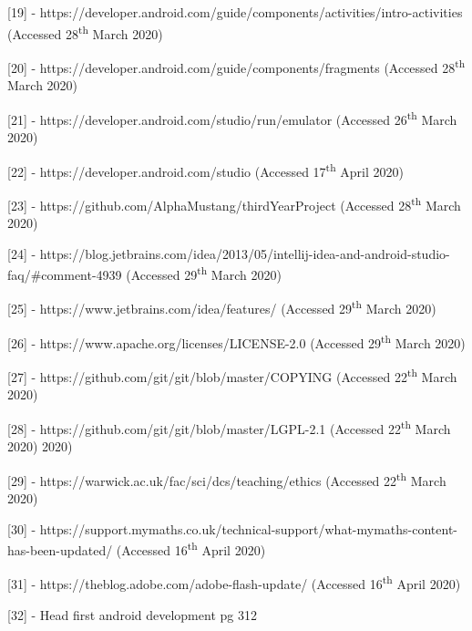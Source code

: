 \documentclass{article}
\begin{document}
[19] - https://developer.android.com/guide/components/activities/intro-activities (Accessed 28\textsuperscript{th} March 2020) \par

[20] - https://developer.android.com/guide/components/fragments (Accessed 28\textsuperscript{th} March 2020) \par

[21] - https://developer.android.com/studio/run/emulator (Accessed 26\textsuperscript{th} March 2020) \par

[22] - https://developer.android.com/studio (Accessed 17\textsuperscript{th} April 2020) \par

[23] - https://github.com/AlphaMustang/thirdYearProject (Accessed 28\textsuperscript{th} March 2020) \par

[24] - https://blog.jetbrains.com/idea/2013/05/intellij-idea-and-android-studio-faq/\#comment-4939 (Accessed 29\textsuperscript{th} March 2020) \par

[25] - https://www.jetbrains.com/idea/features/ (Accessed 29\textsuperscript{th} March 2020) \par

[26] - https://www.apache.org/licenses/LICENSE-2.0 (Accessed 29\textsuperscript{th} March 2020) \par

[27] - https://github.com/git/git/blob/master/COPYING (Accessed 22\textsuperscript{th} March 2020) \par

[28] - https://github.com/git/git/blob/master/LGPL-2.1 (Accessed 22\textsuperscript{th} March 2020) 2020) \par

[29] - https://warwick.ac.uk/fac/sci/dcs/teaching/ethics (Accessed 22\textsuperscript{th} March 2020) \par

[30] - https://support.mymaths.co.uk/technical-support/what-mymaths-content-has-been-updated/ (Accessed 16\textsuperscript{th} April 2020) \par

[31] - https://theblog.adobe.com/adobe-flash-update/ (Accessed 16\textsuperscript{th} April 2020) \par

[32] - Head first android development pg 312
\end{document}
